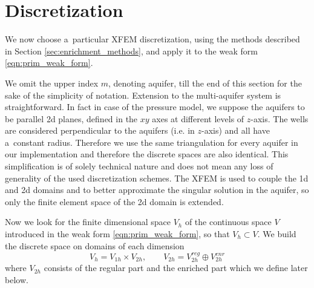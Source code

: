 \section{Discretization}
\label{sec:prim_discretization}

We now choose a~particular XFEM discretization, using the methods described in Section \ref{sec:enrichment_methods},
and apply it to the weak form \eqref{eqn:prim_weak_form}.

We omit the upper index $m$, denoting aquifer, till the end of this section for the sake of the simplicity of notation.
Extension to the multi-aquifer system is straightforward. In fact in case of the pressure model, we suppose the aquifers
to be parallel 2d planes, defined in the $xy$ axes at different levels of $z$-axis. 
The wells are considered perpendicular to the aquifers (i.e. in $z$-axis) and all have a~constant radius.
Therefore we use the same triangulation for every aquifer in our implementation and therefore the discrete spaces are also identical.
This simplification is of solely technical nature and does not mean any loss of generality of the used discretization schemes.
The XFEM is used to couple the 1d and 2d domains and to better approximate the singular solution in the aquifer,
so only the finite element space of the 2d domain is extended.

Now we look for the finite dimensional space $V_h$ of the continuous space $V$ introduced in the weak form \eqref{eqn:prim_weak_form},
so that $V_h\subset V$. We build the discrete space on domains of each dimension
\begin{equation}
    V_h = V_{1h} \times V_{2h}, \qquad V_{2h} = V_{2h}^{reg} \oplus V_{2h}^{enr}
\end{equation}
where $V_{2h}$ consists of the regular part and the enriched part which we define later below.

